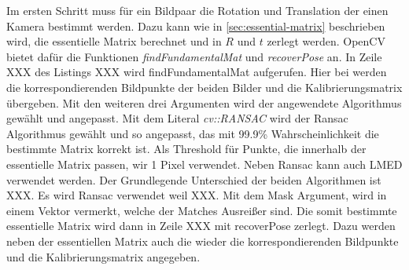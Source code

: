 Im ersten Schritt muss für ein Bildpaar die Rotation und Translation der einen Kamera bestimmt werden.
Dazu kann wie in \cref{sec:essential-matrix} beschrieben wird, die essentielle Matrix berechnet und in $R$ und $t$ zerlegt werden.
OpenCV bietet dafür die Funktionen \emph{findFundamentalMat} und \emph{recoverPose} an.
In Zeile XXX des Listings XXX wird findFundamentalMat aufgerufen. 
Hier bei werden die korrespondierenden Bildpunkte der beiden Bilder und die Kalibrierungsmatrix übergeben.
Mit den weiteren drei Argumenten wird der angewendete Algorithmus gewählt und angepasst.
Mit dem Literal \emph{cv::RANSAC} wird der Ransac Algorithmus gewählt und so angepasst, das mit 99.9\% Wahrscheinlichkeit die bestimmte Matrix korrekt ist.
Als Threshold für Punkte, die innerhalb der essentielle Matrix passen, wir 1 Pixel verwendet. 
Neben Ransac kann auch LMED verwendet werden.
Der Grundlegende Unterschied der beiden Algorithmen ist XXX.
Es wird Ransac verwendet weil XXX.
Mit dem Mask Argument, wird in einem Vektor vermerkt, welche der Matches Ausreißer sind.
Die somit bestimmte essentielle Matrix wird dann in Zeile XXX mit recoverPose zerlegt.
Dazu werden neben der essentiellen Matrix auch die wieder die korrespondierenden Bildpunkte und die Kalibrierungsmatrix angegeben.


